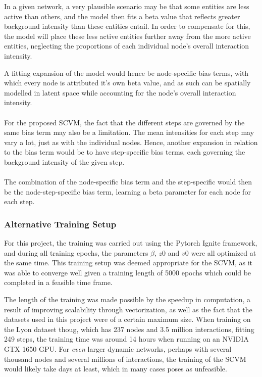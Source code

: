 In a given network, a very plausible scenario may be that some entities are less active than others, and the model then fits a beta value that reflects greater background intensity than these entities entail.
In order to compensate for this, the model will place these less active entities further away from the more active entities, neglecting the proportions of each individual node's overall interaction intensity.

A fitting expansion of the model would hence be node-specific bias terms, with which every node is attributed it's own beta value, and as such can be spatially modelled in latent space while accounting for the node's overall interaction intensity. 
\\\\
For the proposed SCVM, the fact that the different steps are governed by the same bias term may also be a limitation. 
The mean intensities for each step may vary a lot, just as with the individual nodes.
Hence, another expansion in relation to the bias term would be to have step-specific bias terms, each governing the background intensity of the given step.
\\\\
The combination of the node-specific bias term and the step-specific would then be the node-step-specific bias term, learning a beta parameter for each node for each step.


\subsubsection{Alternative Training Setup}
\label{sec:Discussion:Results:AlternativeTrainingSetups}
For this project, the training was carried out using the Pytorch Ignite framework, and during all training epochs, the parameters $\beta$, $z0$ and $v0$ were all optimized at the same time.
This training setup was deemed appropriate for the SCVM, as it was able to converge well given a training length of 5000 epochs which could be completed in a feasible time frame.

The length of the training was made possible by the speedup in computation, a result of improving scalability through vectorization, as well as the fact that the datasets used in this project were of a certain maximum size.
When training on the Lyon dataset thoug, which has 237 nodes and 3.5 million interactions, fitting 249 steps, the training time was around 14 hours when running on an NVIDIA GTX 1650 GPU.
For \textit{even} larger dynamic networks, perhaps with several thousand nodes and several millions of interactions, the training of the SCVM would likely take days at least, which in many cases poses as unfeasible. 

